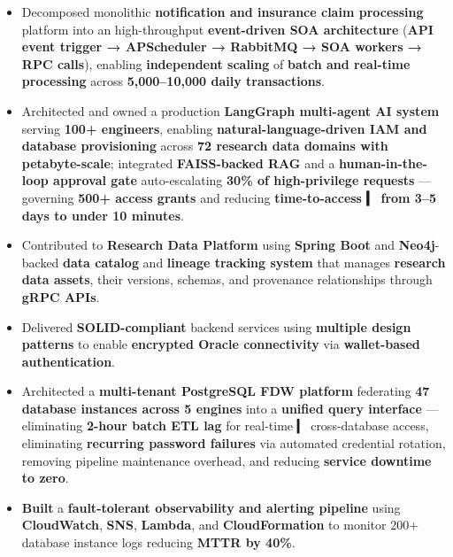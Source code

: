 \documentclass[11 pt]{article}
\begin{document}
\begin{itemize}

\item Decomposed monolithic \textbf{notification and insurance claim processing} platform into an high-throughput \textbf{event-driven SOA architecture} (\textbf{API event trigger → APScheduler → RabbitMQ → SOA workers → RPC calls}),
  enabling \textbf{independent scaling} of \textbf{batch and real-time processing} across \textbf{5,000--10,000 daily transactions}.

  \item  Architected and owned a production \textbf{LangGraph multi-agent AI system} serving \textbf{100+ engineers}, enabling \textbf{natural-language-driven IAM and database provisioning} across \textbf{72 research data domains with petabyte-scale}; integrated \textbf{FAISS-backed RAG} and a \textbf{human-in-the-loop approval gate} auto-escalating \textbf{30\% of high-privilege requests} --- governing \textbf{500+ access grants} and reducing \textbf{time-to-access
  ▎ from 3--5 days to under 10 minutes}.

  \item Contributed to \textbf{Research Data Platform} using \textbf{Spring Boot} and \textbf{Neo4j}-backed \textbf{data catalog} and \textbf{lineage tracking system} that manages \textbf{research data assets}, their versions,
  schemas, and provenance relationships through \textbf{gRPC APIs}.

  \item Delivered \textbf{SOLID-compliant} backend services using \textbf{ multiple design patterns} to enable \textbf{encrypted Oracle connectivity} via \textbf{wallet-based authentication}.

\item Architected a \textbf{multi-tenant PostgreSQL FDW platform} federating \textbf{47 database instances across 5 engines} into a \textbf{unified query interface} --- eliminating \textbf{2-hour batch ETL lag} for real-time
  ▎ cross-database access, eliminating \textbf{recurring password failures} via automated credential rotation, removing pipeline maintenance overhead, and reducing \textbf{service downtime to zero}.

  \item \textbf{Built} a \textbf{fault-tolerant observability and alerting pipeline} using \textbf{CloudWatch}, \textbf{SNS}, \textbf{Lambda}, and \textbf{CloudFormation} to monitor 200+ database instance logs reducing \textbf{MTTR by 40\%}.


\end{itemize}
\end{document}

